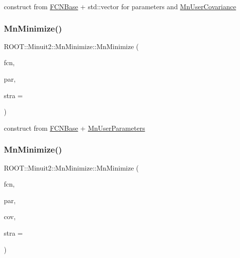 construct from \mbox{\hyperlink{classROOT_1_1Minuit2_1_1FCNBase}{F\+C\+N\+Base}} + std\+::vector for parameters and \mbox{\hyperlink{classROOT_1_1Minuit2_1_1MnUserCovariance}{Mn\+User\+Covariance}} 

\mbox{\label{classROOT_1_1Minuit2_1_1MnMinimize_a0d930638a3d23f7ca1a8dc3f016a4730}} 
\subsubsection{\texorpdfstring{MnMinimize()}{MnMinimize()}\hspace{0.1cm}{\footnotesize\ttfamily [17/26]}}
{\footnotesize\ttfamily R\+O\+O\+T\+::\+Minuit2\+::\+Mn\+Minimize\+::\+Mn\+Minimize (\begin{DoxyParamCaption}\item[{const \mbox{\hyperlink{classROOT_1_1Minuit2_1_1FCNBase}{F\+C\+N\+Base}} \&}]{fcn,  }\item[{const \mbox{\hyperlink{classROOT_1_1Minuit2_1_1MnUserParameters}{Mn\+User\+Parameters}} \&}]{par,  }\item[{unsigned int}]{stra = {} }\end{DoxyParamCaption})\hspace{0.3cm}{\ttfamily [inline]}}



construct from \mbox{\hyperlink{classROOT_1_1Minuit2_1_1FCNBase}{F\+C\+N\+Base}} + \mbox{\hyperlink{classROOT_1_1Minuit2_1_1MnUserParameters}{Mn\+User\+Parameters}} 

\mbox{\label{classROOT_1_1Minuit2_1_1MnMinimize_a0f9bbcbd7bd87cb2f613f8d01ef49d86}} 
\subsubsection{\texorpdfstring{MnMinimize()}{MnMinimize()}\hspace{0.1cm}{\footnotesize\ttfamily [18/26]}}
{\footnotesize\ttfamily R\+O\+O\+T\+::\+Minuit2\+::\+Mn\+Minimize\+::\+Mn\+Minimize (\begin{DoxyParamCaption}\item[{const \mbox{\hyperlink{classROOT_1_1Minuit2_1_1FCNBase}{F\+C\+N\+Base}} \&}]{fcn,  }\item[{const \mbox{\hyperlink{classROOT_1_1Minuit2_1_1MnUserParameters}{Mn\+User\+Parameters}} \&}]{par,  }\item[{const \mbox{\hyperlink{classROOT_1_1Minuit2_1_1MnUserCovariance}{Mn\+User\+Covariance}} \&}]{cov,  }\item[{unsigned int}]{stra = {} }\end{DoxyParamCaption})\hspace{0.3cm}{\ttfamily [inline]}}



